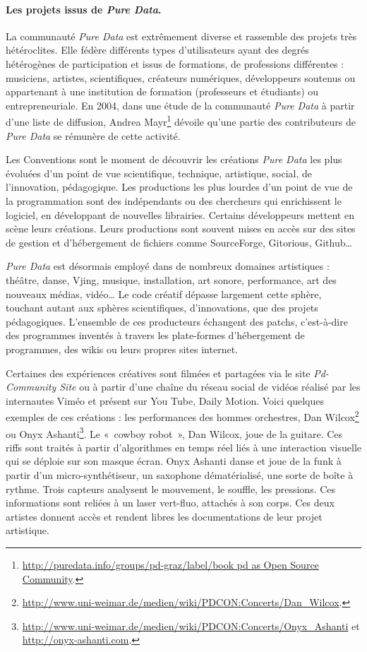\documentclass{FramateX}
\begin{document}
\begin{refsection}
\paragraph{Les projets issus de \textit{Pure Data}.}
La communauté \textit{Pure Data} est extrêmement diverse et rassemble des projets
très hétéroclites. Elle fédère différents types d'utilisateurs ayant
des degrés hétérogènes de participation et issus de formations, de
professions différentes : musiciens, artistes, scientifiques, créateurs
numériques, développeurs soutenus ou appartenant à une institution de
formation (professeurs et étudiants) ou entrepreneuriale. En 2004, dans
une étude de la communauté \textit{Pure Data} à partir d'une liste de diffusion,
Andrea Mayr\footnote{\url{http://puredata.info/groups/pd-graz/label/book
pd as Open Source Community}.} dévoile qu'une partie des contributeurs de
\textit{Pure Data} se rémunère de cette activité. 

Les Conventions sont le moment de découvrir les créations \textit{Pure Data} les
plus évoluées d'un point de vue scientifique, technique, artistique,
social, de l'innovation, pédagogique. Les productions les plus lourdes
d'un point de vue de la programmation sont des indépendants ou des
chercheurs qui enrichissent le logiciel, en développant de nouvelles
librairies. Certains développeurs mettent en scène leurs créations.
Leurs productions sont souvent mises en accès sur des sites de gestion
et d'hébergement de fichiers comme SourceForge, Gitorious, Github… 

\textit{Pure Data} est désormais employé dans de nombreux domaines artistiques :
théâtre, danse, Vjing, musique, installation, art sonore, performance,
art des nouveaux médias, vidéo… Le code créatif dépasse largement cette
sphère, touchant autant aux sphères scientifiques, d'innovations, que
des projets pédagogiques. L'ensemble de ces producteurs échangent des
patchs, c'est-à-dire des programmes inventés à travers les plate-formes
d'hébergement de programmes, des wikis ou leurs propres sites internet.


Certaines des expériences créatives sont filmées et partagées via le
site \textit{Pd-Community Site} ou à partir d'une chaîne du réseau social de
vidéos réalisé par les internautes Viméo et présent sur You Tube, Daily
Motion. Voici quelques exemples de ces créations : les performances des
hommes orchestres, Dan
Wilcox\footnote{\url{http://www.uni-weimar.de/medien/wiki/PDCON:Concerts/Dan\_Wilcox}.}
ou Onyx Ashanti\footnote{\url{http://www.uni-weimar.de/medien/wiki/PDCON:Concerts/Onyx\_Ashanti} et \url{http://onyx-ashanti.com}.}. Le «~cowboy robot~», Dan Wilcox, joue de la
guitare. Ces riffs sont traités à partir d'algorithmes en temps réel
liés à une interaction visuelle qui se déploie sur son masque écran.
Onyx Ashanti danse et joue de la funk à partir d'un micro-synthétiseur,
un saxophone dématérialisé, une sorte de boîte à rythme. Trois capteurs
analysent le mouvement, le souffle, les pressions. Ces informations
sont reliées à un laser vert-fluo, attachés à son corps. Ces deux
artistes donnent accès et rendent libres les documentations de leur
projet artistique. 


\end{refsection}
\end{document}
